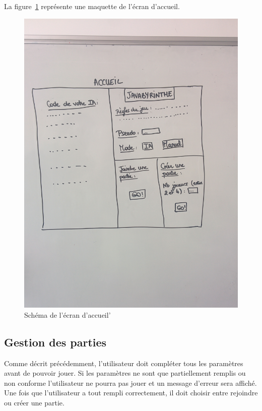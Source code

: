 La figure~\ref{fig:ecran_accueil} représente une maquette de l'écran d'accueil.
\begin{figure}[h]
	\centering
	\includegraphics[scale=0.2]{images/schema_ecran_accueil.jpg}
	\caption{Schéma de l'écran d'accueil'}
	\label{fig:ecran_accueil}
\end{figure}

\subsection{Gestion des parties}

Comme décrit précédemment, l'utilisateur doit compléter tous les paramètres avant de pouvoir jouer. Si les paramètres ne sont que partiellement remplis ou non conforme l'utilisateur ne pourra pas jouer et un message d'erreur sera affiché. Une fois que l'utilisateur a tout rempli correctement, il doit choisir entre rejoindre ou créer une partie. 

